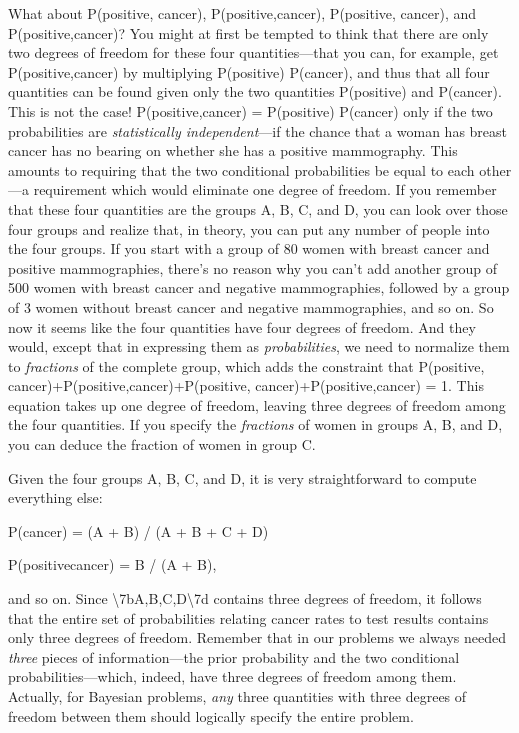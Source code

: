 {
 What about P(positive, cancer), P(positive,{\textlnot}cancer),
P({\textlnot}positive, cancer), and
P({\textlnot}positive,{\textlnot}cancer)? You might at first be tempted
to think that there are only two degrees of freedom for these four
quantities---that you can, for example, get
P(positive,{\textlnot}cancer) by multiplying P(positive) {\texttimes}
P({\textlnot}cancer), and thus that all four quantities can be found
given only the two quantities P(positive) and P(cancer). This is not
the case! P(positive,{\textlnot}cancer) = P(positive) {\texttimes}
P({\textlnot}cancer) only if the two probabilities are
\textit{statistically independent}{}---if the chance that a woman has
breast cancer has no bearing on whether she has a positive mammography.
This amounts to requiring that the two conditional probabilities be
equal to each other---a requirement which would eliminate one degree of
freedom. If you remember that these four quantities are the groups A,
B, C, and D, you can look over those four groups and realize that, in
theory, you can put any number of people into the four groups. If you
start with a group of 80 women with breast cancer and positive
mammographies, there's no reason why you
can't add another group of 500 women with breast cancer
and negative mammographies, followed by a group of 3 women without
breast cancer and negative mammographies, and so on. So now it seems
like the four quantities have four degrees of freedom. And they would,
except that in expressing them as \textit{probabilities}, we need to
normalize them to \textit{fractions} of the complete group, which adds
the constraint that P(positive,
cancer)+P(positive,{\textlnot}cancer)+P({\textlnot}positive,
cancer)+P({\textlnot}positive,{\textlnot}cancer) = 1. This equation
takes up one degree of freedom, leaving three degrees of freedom among
the four quantities. If you specify the \textit{fractions} of women in
groups A, B, and D, you can deduce the fraction of women in group C.}

{
 Given the four groups A, B, C, and D, it is very straightforward
to compute everything else:}

{\centering
 P(cancer) = (A + B) / (A + B + C + D)
\par}


\bigskip

{\centering
 P({\textlnot}positive{\textbar}cancer) = B / (A + B),
\par}


\bigskip

{
 and so on. Since
{\textbackslash}{\textquotesingle}7bA,B,C,D{\textbackslash}{\textquotesingle}7d
contains three degrees of freedom, it follows that the entire set of
probabilities relating cancer rates to test results contains only three
degrees of freedom. Remember that in our problems we always needed
\textit{three} pieces of information---the prior probability and the
two conditional probabilities---which, indeed, have three degrees of
freedom among them. Actually, for Bayesian problems, \textit{any} three
quantities with three degrees of freedom between them should logically
specify the entire problem.}

